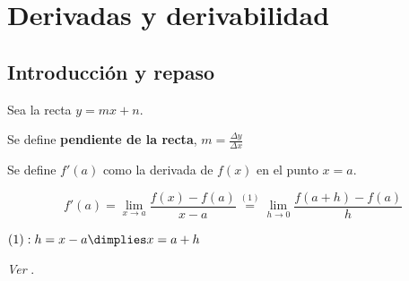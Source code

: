 
\newpage\section{Derivadas y derivabilidad}

\subsection{Introducción y repaso}
\begin{defn}
Sea la recta $y=mx+n$.

Se define \textbf{pendiente de la recta}, $m=\frac{\Delta y}{\Delta x}$
\end{defn}

\begin{defn}
Se define $f'(a)$ como la derivada de $f(x)$ en el punto $x=a$.

\[f'(a) = \lim_{x\to a}\frac{f(x)-f(a)}{x-a} \overset{(1)}{=} \lim_{h\to 0}\frac{f(a+h)-f(a)}{h}\]

$(1): h=x-a \dimplies x=a+h$

\textit{Ver }.
\end{defn}


